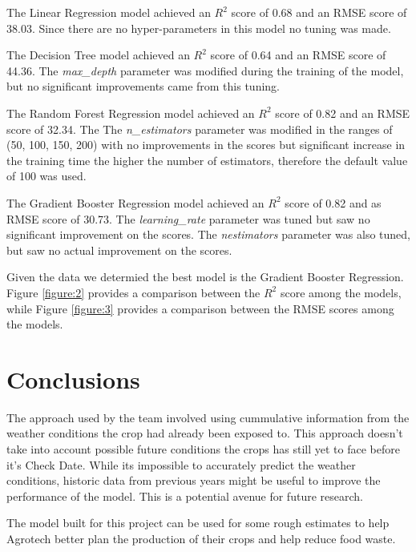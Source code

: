 \documentclass{article}
\begin{document}
The Linear Regression model achieved an \(R^2\) score of 0.68 and an RMSE score of
38.03. Since there are no hyper-parameters in this model no tuning was made.

The Decision Tree model achieved an \(R^2\) score of 0.64 and an RMSE score of
44.36. The \emph{max\_depth} parameter was modified during the training of the model,
but no significant improvements came from this tuning.

The Random Forest Regression model achieved an \(R^2\) score of 0.82 and an RMSE score of
32.34. The The \emph{n\_estimators} parameter was modified in the ranges of (50, 100, 150, 200)
with no improvements in the scores but significant increase in the training time the higher
the number of estimators, therefore the default value of 100 was used.

The Gradient Booster Regression model achieved an \(R^2\) score of 0.82 and as RMSE score of
30.73. The \emph{learning\_rate} parameter was tuned but saw no significant
improvement on the scores. The \emph{nestimators} parameter was also tuned,
but saw no actual improvement on the scores.

Given the data we determied the best model is the Gradient Booster Regression.
Figure \ref{figure:2} provides a comparison between the \(R^2\) score
among the models, while Figure \ref{figure:3} provides a comparison between
the RMSE scores among the models.

\section{Conclusions}
The approach used by the team involved using cummulative information from the weather conditions
the crop had already been exposed to. This approach doesn't take into account possible
future conditions the crops has still yet to face before it's Check Date. While its
impossible to accurately predict the weather conditions, historic data from previous
years might be useful to improve the performance of the model. This is a potential avenue
for future research.

The model built for this project can be used for some rough estimates to help Agrotech
better plan the production of their crops and help reduce food waste.

\pagebreak



\end{document}
